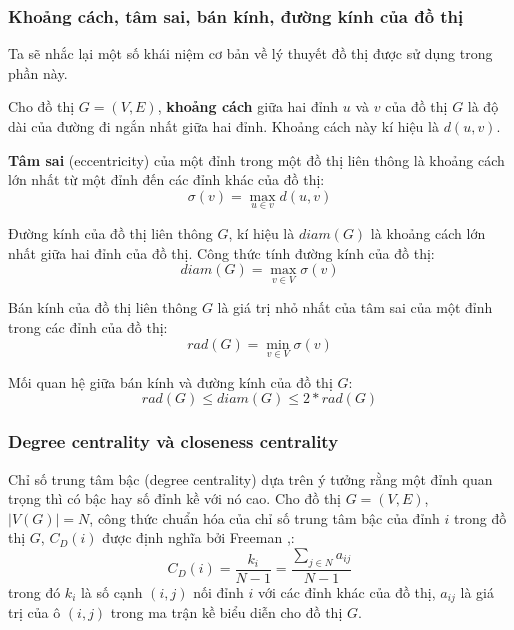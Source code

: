 \documentclass[14pt, oneside, a4paper, openany]{scrartcl}
\begin{document}
\subsubsection{Khoảng cách, tâm sai, bán kính, đường kính của đồ thị}
Ta sẽ nhắc lại một số khái niệm cơ bản về lý thuyết đồ thị được sử dụng trong phần này.

\cite{graphtextbook} Cho đồ thị $G=(V,E)$, \textbf{khoảng cách}  giữa hai đỉnh $u$ và $v$ của đồ thị $G$ là độ dài của đường đi ngắn nhất giữa hai đỉnh. Khoảng cách này kí hiệu là $d(u,v)$.

\cite{graphtextbook} \textbf{Tâm sai}  (eccentricity) của một đỉnh trong một đồ thị liên thông là khoảng cách lớn nhất từ một đỉnh đến các đỉnh khác của đồ thị:
\begin{equation}
	\sigma(v) = \max_{u \in v} d(u,v)
\end{equation}

\cite{graphtextbook} Đường kính của đồ thị liên thông $G$, kí hiệu là $diam(G)$ là khoảng cách lớn nhất giữa hai đỉnh của đồ thị. Công thức tính đường kính của đồ thị:
\begin{equation}
	diam(G) = \max_{v \in V} \sigma(v)
\end{equation}

\cite{graphtextbook} Bán kính của đồ thị liên thông $G$ là giá trị nhỏ nhất của tâm sai của một đỉnh trong các đỉnh của đồ thị:
\begin{equation}
	rad(G) = \min_{v \in V} \sigma(v)
\end{equation}

\cite{graphtextbook} Mối quan hệ giữa bán kính và đường kính của đồ thị $G$:
\begin{equation}
	rad(G) \leq diam(G) \leq 2 * rad(G)
\end{equation}

\subsubsection{Degree centrality và closeness centrality}
Chỉ số trung tâm bậc (degree centrality) dựa trên ý tưởng rằng một đỉnh quan trọng thì có bậc hay số đỉnh kề với nó cao. Cho đồ thị $G=(V,E)$, $|V(G)| = N$, công thức chuẩn hóa của chỉ số trung tâm bậc của đỉnh $i$ trong đồ thị $G$, $C_D(i)$ được định nghĩa bởi Freeman \cite{centrali01},\cite{centrali02}:
\begin{equation}
	C_D(i) = \frac{k_i}{N-1} = \frac{\sum_{j \in N}a_{ij}}{N-1}
\end{equation}
trong đó $k_i$ là số cạnh $(i,j)$ nối đỉnh $i$ với các đỉnh khác của đồ thị, $a_{ij}$ là giá trị của ô $(i,j)$ trong ma trận kề biểu diễn cho đồ thị $G$.
\end{document}
